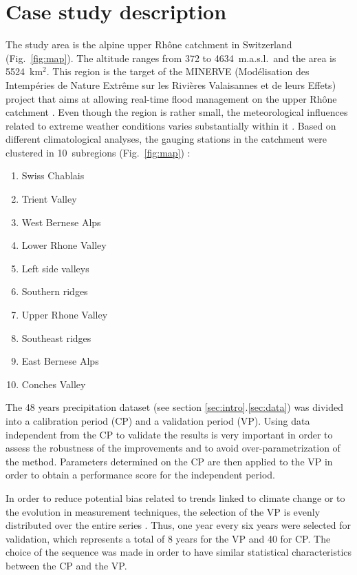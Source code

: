 \documentclass[5p]{elsarticle}
\begin{document}
\section{Case study description}
\label{sec:case_study}

The study area is the alpine upper Rh\^{o}ne catchment in Switzerland (Fig.\ \ref{fig:map}). The altitude ranges from 372 to 4634~m.a.s.l.\ and the area is 5524~km$^{2}$. This region is the target of the MINERVE (Mod\'{e}lisation des Intemp\'{e}ries de Nature Extr\^{e}me sur les Rivi\`{e}res Valaisannes et de leurs Effets) project that aims at allowing real-time flood management on the upper Rh\^{o}ne catchment \citep{GarciaHernandez2009b}. Even though the region is rather small, the meteorological influences related to extreme weather conditions varies substantially within it \citep[see][]{Horton2012}. Based on different climatological analyses, the gauging stations in the catchment were clustered in 10~subregions (Fig.\ \ref{fig:map}) :

\begin{enumerate}
	\item Swiss Chablais
	\item Trient Valley
	\item West Bernese Alps
	\item Lower Rhone Valley
	\item Left side valleys
	\item Southern ridges
	\item Upper Rhone Valley
	\item Southeast ridges
	\item East Bernese Alps
	\item Conches Valley
\end{enumerate}

The 48 years precipitation dataset (see section \ref{sec:intro}.\ref{sec:data}) was divided into a calibration period (CP) and a validation period (VP). Using data independent from the CP to validate the results is very important in order to assess the robustness of the improvements and to avoid over-parametrization of the method. Parameters determined on the CP are then applied to the VP in order to obtain a performance score for the independent period.

In order to reduce potential bias related to trends linked to climate change or to the evolution in measurement techniques, the selection of the VP is evenly distributed over the entire series \citep{BenDaoud2010}. Thus, one year every six years were selected for validation, which represents a total of 8 years for the VP and 40 for CP. The choice of the sequence was made in order to have similar statistical characteristics between the CP and the VP.
\end{document}
